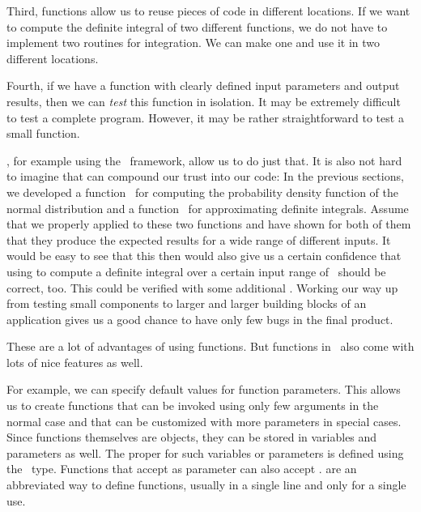 Third, functions allow us to reuse pieces of code in different locations.
If we want to compute the definite integral of two different functions, we do not have to implement two routines for integration.
We can make one and use it in two different locations.

Fourth, if we have a function with clearly defined input parameters and output results, then we can \emph{test} this function in isolation.
It may be extremely difficult to test a complete program.
However, it may be rather straightforward to test a small function.

, for example using the \pytest\ framework, allow us to do just that.
It is also not hard to imagine that  can compound our trust into our code:
In the previous sections, we developed a function~ for computing the probability density function of the normal distribution and a function~ for approximating definite integrals.
Assume that we properly applied  to these two functions and have shown for both of them that they produce the expected results for a wide range of different inputs.
It would be easy to see that this then would also give us a certain confidence that using  to compute a definite integral over a certain input range of~ should be correct, too.
This could be verified with some additional .
Working our way up from testing small components to larger and larger building blocks of an application gives us a good chance to have only few bugs in the final product.

These are a lot of advantages of using functions.
But functions in \python\ also come with lots of nice features as well.

For example, we can specify default values for function parameters.
This allows us to create functions that can be invoked using only few arguments in the normal case and that can be customized with more parameters in special cases.
Since functions themselves are objects, they can be stored in variables and parameters as well.
The proper  for such variables or parameters is defined using the~ type.
Functions that accept  as parameter can also accept .
 are an abbreviated way to define functions, usually in a single line and only for a single use.%
\endhsection%
%
\endhsection%
%
